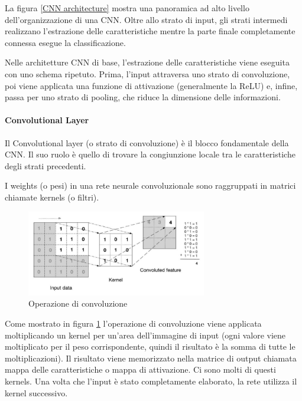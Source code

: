         La figura \ref{CNN architecture} mostra una panoramica ad alto livello dell'organizzazione di una CNN. Oltre allo strato di input, gli strati intermedi realizzano l'estrazione delle caratteristiche mentre la parte finale completamente connessa esegue la classificazione.
        
        Nelle architetture CNN di base, l'estrazione delle caratteristiche viene eseguita con uno schema ripetuto. Prima, l'input attraversa uno strato di convoluzione, poi viene applicata una funzione di attivazione (generalmente la ReLU) e, infine, passa per uno strato di pooling, che riduce la dimensione delle informazioni.
        
        \paragraph{Convolutional Layer}
        Il Convolutional layer (o strato di convoluzione) è il blocco fondamentale della CNN. Il suo ruolo è quello di trovare la congiunzione locale tra le caratteristiche degli strati precedenti.
        
        I weights (o pesi) in una rete neurale convoluzionale sono raggruppati in matrici chiamate kernels (o filtri).
            \begin{figure}[!h]
                \centering
                \includegraphics[width=0.7\textwidth]{Images/NN/Convolutional Layer.png}
                \caption{Operazione di convoluzione}
                \label{Convolution}
            \end{figure}
        
        \newpage
        Come mostrato in figura \ref{Convolution} l'operazione di convoluzione viene applicata moltiplicando un kernel per un'area dell'immagine di input (ogni valore viene moltiplicato per il peso corrispondente, quindi il risultato è la somma di tutte le moltiplicazioni). Il risultato viene memorizzato nella matrice di output chiamata mappa delle caratteristiche o mappa di attivazione. Ci sono molti di questi kernels. Una volta che l'input è stato completamente elaborato, la rete utilizza il kernel successivo. 
        

